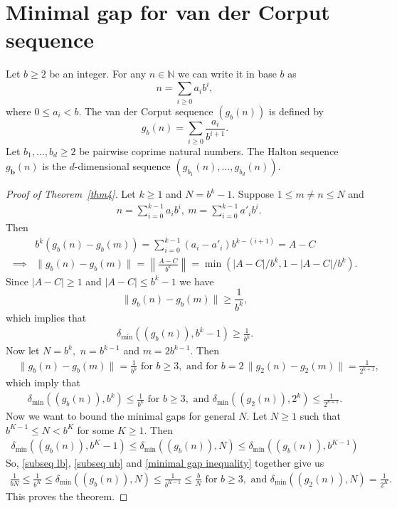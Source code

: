 \documentclass[12pt,article]{amsart}
\theoremstyle{remark}
\numberwithin{equation}{section}
\newcommand{\N}{\mathbb{N}}
\newcommand{\boldb}{\boldsymbol{b}}
\begin{document}
	
	\section{Minimal gap for van der Corput sequence}\label{section van der Corput}
	Let $b\geq 2$ be an integer. For any $n\in\N$ we can write it in base $b$ as
	\[n=\sum_{i\geq 0}a_ib^i,\]
	where $0\leq a_i<b.$ The van der Corput sequence $(g_b(n))$ is defined by
	\[g_b(n)=\sum_{i\geq 0}\frac{a_i}{b^{i+1}}.\]
	Let $b_1,\dots,b_d\geq 2$ be pairwise coprime natural numbers. The Halton sequence $g_{\boldb}(n)$ is the $d$-dimensional sequence $(g_{b_1}(n),\dots,g_{b_d}(n)).$
	\begin{proof}[Proof of Theorem~\ref{thm4}]
		Let $k\geq1$ and $N=b^k-1.$ Suppose $1\leq m\neq n\leq N$ and
		\begin{align*}
			&n=\sum_{i=0}^{k-1}a_ib^i,\:m=\sum_{i=0}^{k-1}a'_ib^i.
		\end{align*}
		Then
		\begin{align*}
			&b^k(g_b(n)-g_b(m))=\sum_{i=0}^{k-1}(a_i-a'_i)b^{k-(i+1)}=A-C\\
			\implies&\|g_b(n)-g_b(m)\|=\left\|\frac{A-C}{b^k}\right\|=\min(|A-C|/b^k,1-|A-C|/b^k).
		\end{align*}
		Since $|A-C|\geq 1$ and $|A-C|\leq b^k-1$ we have
		\[\|g_b(n)-g_b(m)\|\geq\frac{1}{b^k},\]
		which implies that 
		\begin{align}\label{subseq lb}
			\delta_{\text{min}}((g_b(n)),b^k-1)\geq \frac{1}{b^k}.
		\end{align}
		Now let $N=b^k,$ $n=b^{k-1}$ and $m=2b^{k-1}.$ Then 
		\begin{align*}
			&\|g_b(n)-g_b(m)\|=\frac{1}{b^k} \text{ for }b\geq 3,
			\text{ and for } b=2\,\|g_2(n)-g_2(m)\|=\frac{1}{2^{k+1}},
		\end{align*}
		which imply that 
		\begin{align}\label{subseq ub}
			\delta_{\text{min}}((g_b(n)),b^k)\leq \frac{1}{b^k}\text{ for }b\geq 3,\text{ and }
			\delta_{\text{min}}((g_2(n)),2^k)\leq \frac{1}{2^{k+1}}.
		\end{align}
		Now we want to bound the minimal gaps for general $N.$
		Let $N\geq 1$ such that $b^{K-1}\leq N<b^K$ for some $K\geq 1.$ Then 
		\begin{align}\label{minimal gap inequality}
			\delta_{\text{min}}((g_b(n)),b^K-1)\leq\delta_{\text{min}}((g_b(n)),N)\leq\delta_{\text{min}}((g_b(n)),b^{K-1})
		\end{align}
		So, \eqref{subseq lb}, \eqref{subseq ub} and \eqref{minimal gap inequality} together give us
		\begin{align*}
			\frac{1}{bN}\leq\frac{1}{b^K}\leq\delta_{\text{min}}((g_b(n)),N)\leq\frac{1}{b^{K-1}}\leq\frac{b}{N}\text{ for $b\geq 3,$ and }\delta_{\text{min}}((g_2(n)),N)=\frac{1}{2^{K}}.
		\end{align*}
		This proves the theorem.
	\end{proof}
\end{document}
